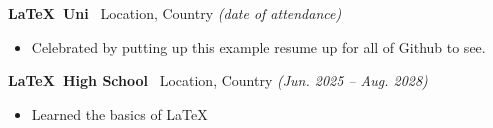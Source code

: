 \documentclass[class=article, crop=false]{standalone}
\begin{document}
\textbf{\LaTeX\ Uni} \textbar\ Location, Country 
\hfill \textsl{(date of attendance)}
\begin{itemize}[leftmargin=*]
	\item Celebrated by putting up this example resume up for 
	      all of Github to see.
\end{itemize}

\split

\textbf{\LaTeX\ High School} \textbar\ Location, Country 
\hfill \textsl{(Jun. 2025 -- Aug. 2028)}
\begin{itemize}[leftmargin=*]
	\item Learned the basics of \LaTeX
\end{itemize}
\end{document}
